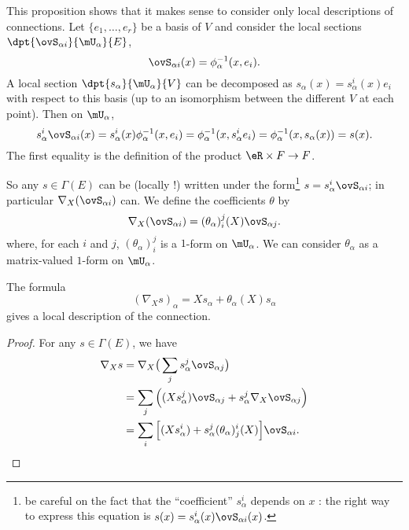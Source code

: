 This proposition shows that it makes sense to consider only local descriptions of connections.  Let $\{e_1,\ldots,e_r\}$ be a basis of $V$ and consider the local sections $\dpt{\ovS_{\alpha i}}{\mU_{\alpha}}{E}$,
\[
  \ovS_{\alpha i}(x)=\phi_{\alpha}^{-1}(x,e_i).
\]
A local section $\dpt{s_{\alpha}}{\mU_{\alpha}}{V}$ can be decomposed as $s_{\alpha}(x)=s_{\alpha}^i(x)e_i$ with respect to this basis (up to an isomorphism between the different $V$ at each point). Then on $\mU_{\alpha}$,
\begin{equation}
  s_{\alpha}^i\ovS_{\alpha i}(x)=s_{\alpha}^i(x)\phi_{\alpha}^{-1}(x,e_i)
                              =\phi_{\alpha}^{-1}(x,s_{\alpha}^ie_i)
			      =\phi_{\alpha}^{-1}(x,s_{\alpha}(x))
			      =s(x).
\end{equation}
The first equality is the definition of the product $\eR\times F\to F$.

So any $s\in\Gamma(E)$ can be (locally !) written under the form\footnote{be careful on the fact that the ``coefficient'' $s_{\alpha}^i$ depends on $x$ : the right way to express this equation is $s(x)=s^i_{\alpha}(x)\ovS_{\alpha i}(x)$.} $s=s_{\alpha}^i\ovS_{\alpha i}$; in particular $\nabla_X(\ovS_{\alpha i})$ can. We define the coefficients $\theta$ by
\begin{equation}
 \nabla_X(\ovS_{\alpha i})=(\theta_{\alpha})^j_i(X)\ovS_{\alpha j}.
\end{equation}
where, for each $i$ and $j$, $(\theta_{\alpha})^j_i$ is a $1$-form on $\mU_{\alpha}$. We can consider $\theta_{\alpha}$ as a matrix-valued $1$-form on $\mU_{\alpha}$.

\begin{proposition}	\label{PropFormnabXthe}
The formula
\begin{equation}\label{eq:nab_theta}
   (\nabla_Xs)_{\alpha}=Xs_{\alpha}+\theta_{\alpha}(X)s_{\alpha}
\end{equation}
gives a local description of the connection. 
\label{prop:namba_theta_u}
\end{proposition}

\begin{proof}
For any $s\in\Gamma(E)$, we have
\[ 
\begin{split}
\nabla_Xs&=\nabla_X\big(  \sum_j s^j_{\alpha}\ovS_{\alpha j}  \big)\\
         &=\sum_j\Big(  (Xs_{\alpha}^j)\ovS_{\alpha j} + s^j_{\alpha}\nabla_X\ovS_{\alpha j}     \Big)\\
	 &=\sum_i\Big[   (Xs_{\alpha}^i)+s_{\alpha}^j(\theta_{\alpha})_j^i(X)  \Big]\ovS_{\alpha i}.
\end{split}
\]
\end{proof}

